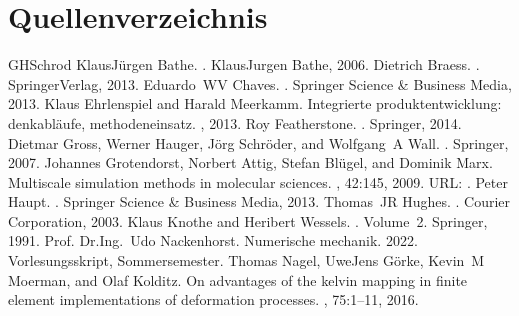 \documentclass[letterpaper,10pt,german]{jupyterBook}
\begin{document}
\chapter{Quellenverzeichnis}
\label{\detokenize{quellen:quellenverzeichnis}}\label{\detokenize{quellen::doc}}
\begin{sphinxthebibliography}{GHSchrod}
\sphinxAtStartPar
Klaus\sphinxhyphen{}Jürgen Bathe. . Klaus\sphinxhyphen{}Jurgen Bathe, 2006.
\sphinxAtStartPar
Dietrich Braess. . Springer\sphinxhyphen{}Verlag, 2013.
\sphinxAtStartPar
Eduardo WV Chaves. . Springer Science \& Business Media, 2013.
\sphinxAtStartPar
Klaus Ehrlenspiel and Harald Meerkamm. Integrierte produktentwicklung: denkabläufe, methodeneinsatz. , 2013.
\sphinxAtStartPar
Roy Featherstone. . Springer, 2014.
\sphinxAtStartPar
Dietmar Gross, Werner Hauger, Jörg Schröder, and Wolfgang A Wall. . Springer, 2007.
\sphinxAtStartPar
Johannes Grotendorst, Norbert Attig, Stefan Blügel, and Dominik Marx. Multiscale simulation methods in molecular sciences. , 42:145, 2009. URL: .
\sphinxAtStartPar
Peter Haupt. . Springer Science \& Business Media, 2013.
\sphinxAtStartPar
Thomas JR Hughes. . Courier Corporation, 2003.
\sphinxAtStartPar
Klaus Knothe and Heribert Wessels. . Volume 2. Springer, 1991.
\sphinxAtStartPar
Prof. Dr.\sphinxhyphen{}Ing. Udo Nackenhorst. Numerische mechanik. 2022. Vorlesungsskript, Sommersemester.
\sphinxAtStartPar
Thomas Nagel, Uwe\sphinxhyphen{}Jens Görke, Kevin M Moerman, and Olaf Kolditz. On advantages of the kelvin mapping in finite element implementations of deformation processes. , 75:1–11, 2016.

\end{sphinxthebibliography}
\end{document}
